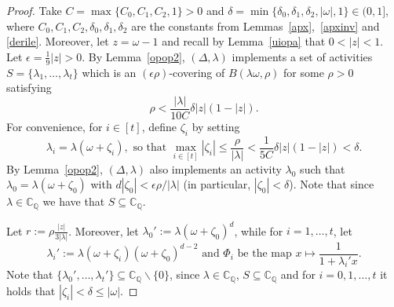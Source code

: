 \documentclass[11pt]{article}
\def\CQ{\mathbb{C}_{\mathbb{Q}}}
\newcommand{\eps}{\epsilon}
\begin{document}
\begin{proof}
Take $C=\max\{C_0,C_1,C_2,1\}>0$ and $\delta =\min\{\delta_0,\delta_1,\delta_2,|\omega|,1\}\in (0,1]$, where $C_0,C_1,C_2,\delta_0,\delta_1,\delta_2$ are the constants from Lemmas~\ref{apx},~\ref{apxinv} and \ref{derile}. Moreover, let $z=\omega-1$ and recall by Lemma~\ref{uiopa} that $0<|z|<1$. Let $\eps = \frac{1}{9}|z|>0$. By Lemma~\ref{opop2}, $(\Delta,\lambda)$ implements a set of activities $S=\{\lambda_1,\hdots,\lambda_t\}$ which is an $(\eps \rho)$-covering  of $B(\lambda \omega,\rho)$ for some $\rho>0$ satisfying
\begin{equation}\label{smallr}
\rho<\frac{|\lambda|}{10C} \delta|z|(1-|z|). 
\end{equation}
 For convenience, for $i\in[t]$, define $\zeta_i$ by setting
\[\lambda_i=\lambda(\omega+\zeta_i), \mbox{ so that }\max_{i\in [t]} |\zeta_i|\leq \frac{\rho}{|\lambda|}<\frac{1}{5C} \delta|z|(1-|z|)<\delta.\]
By Lemma~\ref{opop2}, $(\Delta,\lambda)$ also implements an activity $\lambda_0$ such that $\lambda_0=\lambda(\omega+\zeta_0)$ with $d|\zeta_0|<\epsilon \rho/|\lambda|$ (in particular, $|\zeta_0|<\delta$). Note that since $\lambda\in \CQ$ we have that $S\subseteq \CQ$. 

Let $r:=\displaystyle\rho\frac{|z|}{3|\lambda|}$. Moreover, let $\lambda_0':=\lambda(\omega+\zeta_0)^{d}$, while for $i=1,\hdots,t$, let 
\[\lambda_i':=\lambda(\omega+\zeta_i)(\omega+\zeta_0)^{d-2}  \mbox{ and $\Phi_i$ be the map }x\mapsto \frac{1}{1+\lambda_i' x}.\] 
Note that $\{\lambda_0',\hdots, \lambda_t'\}\subseteq \CQ\backslash\{0\}$, since $\lambda\in \CQ$, $S\subseteq \CQ$ and for $i=0,1,\hdots,t$ it holds that $|\zeta_i|<\delta\leq |\omega|$.


\end{proof}
\end{document}
